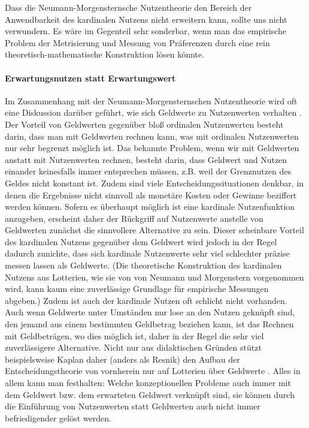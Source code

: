 Dass die Neumann-Morgensternsche Nutzentheorie den Bereich der Anwendbarkeit des
kardinalen Nutzens nicht erweitern kann, sollte uns nicht verwundern. Es wäre im
Gegenteil sehr sonderbar, wenn man das empirische Problem der Metrisierung und
Messung von Präferenzen durch eine rein theoretisch-mathematische Konstruktion
lösen könnte.

\paragraph{Erwartungsnutzen statt Erwartungswert}

Im Zusammenhang mit der Neumann-Morgensternschen Nutzentheorie wird oft eine
Diskussion darüber geführt, wie sich Geldwerte zu Nutzenwerten verhalten \cite[S.
85ff.]{resnik:1987}. Der Vorteil von Geldwerten gegenüber bloß ordinalen
Nutzenwerten besteht darin, dass man mit Geldwerten rechnen kann, was mit
ordinalen Nutzenwerten nur sehr begrenzt möglich ist.
 Das bekannte Problem, wenn
wir mit Geldwerten anstatt mit Nutzenwerten rechnen, besteht darin, dass Geldwert
und Nutzen einander keinesfalls immer entsprechen müssen, z.B. weil der
Grenznutzen des Geldes nicht konstant ist. Zudem sind viele
Entscheidungssituationen denkbar, in denen die Ergebnisse nicht sinnvoll als
monetäre Kosten oder Gewinne beziffert werden können. Sofern es überhaupt möglich
ist eine kardinale Nutzenfunktion anzugeben, erscheint daher der Rückgriff auf
Nutzenwerte anstelle von Geldwerten zunächst die sinnvollere Alternative zu sein.
Dieser scheinbare Vorteil des kardinalen Nutzens gegenüber dem Geldwert wird
jedoch in der Regel dadurch zunichte, dass sich kardinale Nutzenwerte sehr viel
schlechter präzise messen lassen als Geldwerte. (Die theoretische Konstruktion
des kardinalen Nutzens aus Lotterien, wie sie von von Neumann und Morgenstern
vorgenommen wird, kann kaum eine zuverlässige Grundlage für empirische Messungen
abgeben.) Zudem ist auch der kardinale Nutzen oft schlicht nicht vorhanden.
Auch wenn Geldwerte unter Umständen nur lose an den Nutzen geknüpft sind, den jemand aus
einem bestimmten Geldbetrag beziehen kann, ist das Rechnen mit Geldbeträgen, wo
dies möglich ist, daher in der Regel die sehr viel zuverlässigere Alternative.
Nicht nur aus didaktischen Gründen stützt beispielsweise Kaplan daher (anders als
Resnik) den Aufbau der Entscheidungstheorie von vornherein nur auf Lotterien über
Geldwerte \cite[]{kaplan:1996}. Alles in allem kann man festhalten: Welche
konzeptionellen Probleme auch immer mit dem Geldwert bzw. dem erwarteten Geldwert
verknüpft sind, sie können durch die Einführung von Nutzenwerten statt Geldwerten
auch nicht immer befriedigender gelöst werden.

